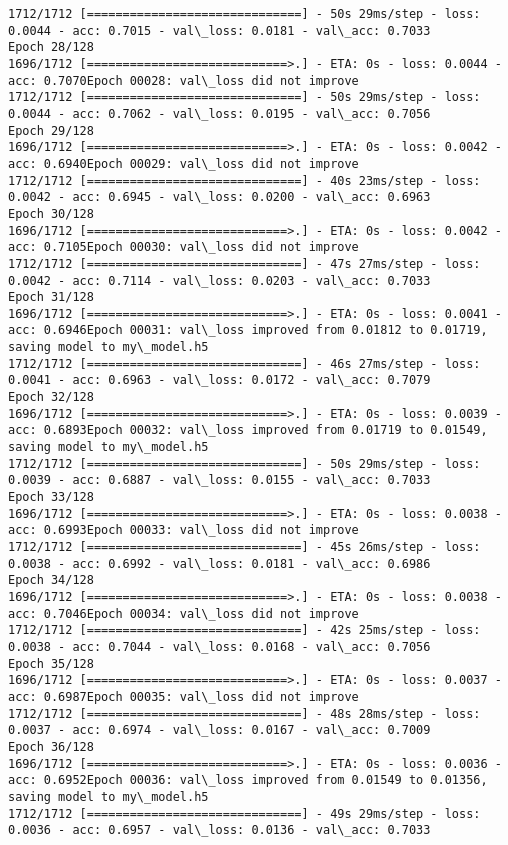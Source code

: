 \documentclass[11pt]{article}
\begin{document}
\begin{Verbatim}[commandchars=\\\{\}]
1712/1712 [==============================] - 50s 29ms/step - loss: 0.0044 - acc: 0.7015 - val\_loss: 0.0181 - val\_acc: 0.7033
Epoch 28/128
1696/1712 [============================>.] - ETA: 0s - loss: 0.0044 - acc: 0.7070Epoch 00028: val\_loss did not improve
1712/1712 [==============================] - 50s 29ms/step - loss: 0.0044 - acc: 0.7062 - val\_loss: 0.0195 - val\_acc: 0.7056
Epoch 29/128
1696/1712 [============================>.] - ETA: 0s - loss: 0.0042 - acc: 0.6940Epoch 00029: val\_loss did not improve
1712/1712 [==============================] - 40s 23ms/step - loss: 0.0042 - acc: 0.6945 - val\_loss: 0.0200 - val\_acc: 0.6963
Epoch 30/128
1696/1712 [============================>.] - ETA: 0s - loss: 0.0042 - acc: 0.7105Epoch 00030: val\_loss did not improve
1712/1712 [==============================] - 47s 27ms/step - loss: 0.0042 - acc: 0.7114 - val\_loss: 0.0203 - val\_acc: 0.7033
Epoch 31/128
1696/1712 [============================>.] - ETA: 0s - loss: 0.0041 - acc: 0.6946Epoch 00031: val\_loss improved from 0.01812 to 0.01719, saving model to my\_model.h5
1712/1712 [==============================] - 46s 27ms/step - loss: 0.0041 - acc: 0.6963 - val\_loss: 0.0172 - val\_acc: 0.7079
Epoch 32/128
1696/1712 [============================>.] - ETA: 0s - loss: 0.0039 - acc: 0.6893Epoch 00032: val\_loss improved from 0.01719 to 0.01549, saving model to my\_model.h5
1712/1712 [==============================] - 50s 29ms/step - loss: 0.0039 - acc: 0.6887 - val\_loss: 0.0155 - val\_acc: 0.7033
Epoch 33/128
1696/1712 [============================>.] - ETA: 0s - loss: 0.0038 - acc: 0.6993Epoch 00033: val\_loss did not improve
1712/1712 [==============================] - 45s 26ms/step - loss: 0.0038 - acc: 0.6992 - val\_loss: 0.0181 - val\_acc: 0.6986
Epoch 34/128
1696/1712 [============================>.] - ETA: 0s - loss: 0.0038 - acc: 0.7046Epoch 00034: val\_loss did not improve
1712/1712 [==============================] - 42s 25ms/step - loss: 0.0038 - acc: 0.7044 - val\_loss: 0.0168 - val\_acc: 0.7056
Epoch 35/128
1696/1712 [============================>.] - ETA: 0s - loss: 0.0037 - acc: 0.6987Epoch 00035: val\_loss did not improve
1712/1712 [==============================] - 48s 28ms/step - loss: 0.0037 - acc: 0.6974 - val\_loss: 0.0167 - val\_acc: 0.7009
Epoch 36/128
1696/1712 [============================>.] - ETA: 0s - loss: 0.0036 - acc: 0.6952Epoch 00036: val\_loss improved from 0.01549 to 0.01356, saving model to my\_model.h5
1712/1712 [==============================] - 49s 29ms/step - loss: 0.0036 - acc: 0.6957 - val\_loss: 0.0136 - val\_acc: 0.7033

\end{Verbatim}
\end{document}
